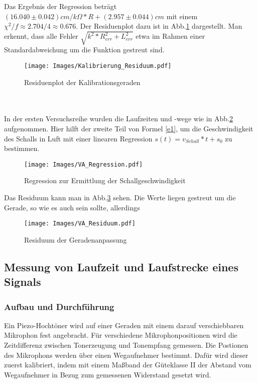 \documentclass[]{article}
\begin{document}
	Das Ergebnis der Regression beträgt $(16.040\pm0.042)cm/k\Omega*R+(2.957\pm0.044)cm$ mit einem $\chi^2/f \approx 2.704/4 \approx 0.676$. Der Residuenplot dazu ist in Abb.\ref{Kalib_Res} dargestellt. Man erkennt, dass alle Fehler $\sqrt{k^2*R_{err}^2+L_{err}^2}$ etwa im Rahmen einer Standardabweichung um die Funktion gestreut sind.                     
	\begin{figure}
		\begin{center}
			\texttt{[image: Images/Kalibrierung\_Residuum.pdf]}
			\caption{Residuenplot der Kalibrationsgeraden}
			\label{Kalib_Res}
		\end{center}
	\end{figure}
	\\ \\
	In der ersten Versuchsreihe wurden die Laufzeiten und -wege wie in Abb.\ref{Va_Reg} aufgenommen. Hier hilft der zweite Teil von Formel \ref{e1}, um die Geschwindigkeit des Schalls in Luft mit einer linearen Regression $s(t)=v_{Schall}*t+s_0$ zu bestimmen. 
	
	\begin{figure}
		\begin{center}
			\texttt{[image: Images/VA\_Regression.pdf]}
			\caption{Regression zur Ermittlung der Schallgeschwindigkeit}
			\label{Va_Reg}
		\end{center}
	\end{figure}	
	Das Residuum kann man in Abb.\ref{Va_Res} sehen. Die Werte liegen gestreut um die Gerade, so wie es auch sein sollte, allerdings 
	\begin{figure}
		\begin{center}
			\texttt{[image: Images/VA\_Residuum.pdf]}
			\caption{Residuum der Geradenanpassung}
			\label{Va_Res}
		\end{center}
	\end{figure}	
	
	\subsection{Messung von Laufzeit und Laufstrecke eines Signals}
	\subsubsection{Aufbau und Durchführung}
	Ein Piezo-Hochtöner wird auf einer Geraden mit einem darauf verschiebbaren Mikrophon fest angebracht. Für verschiedene Mikrophonpositionen wird die Zeitdifferenz zwischen Tonerzeugung und Tonempfang gemessen. Die Postionen des Mikrophons werden über einen Wegaufnehmer bestimmt.
	Dafür wird dieser zuerst kalibriert, indem mit einem Maßband der Güteklasse II der Abstand vom Wegaufnehmer in Bezug zum gemessenen Widerstand gesetzt wird.
\end{document}
